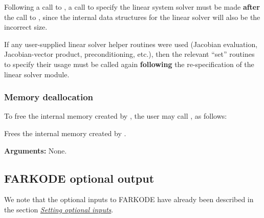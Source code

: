 \documentclass[letterpaper,10pt,english]{sphinxmanual}
\begin{document}
Following a call to {\hyperref[f_interface/Usage:f/_/FARKRESIZE]{}}, a call to specify the
linear system solver must be made \textbf{after} the call to
{\hyperref[f_interface/Usage:f/_/FARKRESIZE]{}}, since the internal data structures for the
linear solver will also be the incorrect size.

If any user-supplied linear solver helper routines were used (Jacobian
evaluation, Jacobian-vector product, preconditioning, etc.), then the
relevant ``set'' routines to specify their usage must be called again
\textbf{following} the re-specification of the linear solver module.


\subsubsection{Memory deallocation}
\label{f_interface/Usage:finterface-deallocation}\label{f_interface/Usage:memory-deallocation}
To free the internal memory created by {\hyperref[f_interface/Usage:f/_/FARKMALLOC]{}}, the user
may call {\hyperref[f_interface/Usage:f/_/FARKFREE]{}}, as follows:

\begin{fulllineitems}
\label{f_interface/Usage:f/_/FARKFREE}
Frees the internal memory created by {\hyperref[f_interface/Usage:f/_/FARKMALLOC]{}}.

\textbf{Arguments:} None.

\end{fulllineitems}



\subsection{FARKODE optional output}
\label{f_interface/Optional_output:finterface-optionaloutputs}\label{f_interface/Optional_output:farkode-optional-output}\label{f_interface/Optional_output::doc}
We note that the optional inputs to FARKODE have already been
described in the section {\hyperref[f_interface/Usage:finterface-optionalinputs]{\emph{Setting optional inputs}}}.
\end{document}
